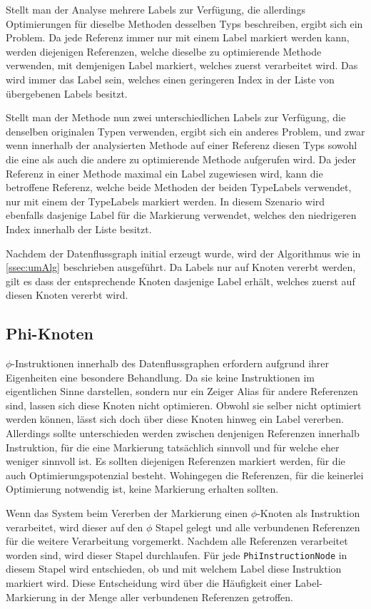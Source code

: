 Stellt man der Analyse mehrere Labels zur Verfügung, die allerdings Optimierungen für 
dieselbe Methoden desselben Typs beschreiben, ergibt sich ein Problem. Da jede 
Referenz immer nur mit einem Label markiert werden kann, werden diejenigen Referenzen, 
welche dieselbe zu optimierende Methode verwenden, mit demjenigen Label markiert, welches 
zuerst verarbeitet wird. Das wird immer das Label sein, welches einen geringeren Index in 
der Liste von übergebenen Labels besitzt. 

Stellt man der Methode nun zwei unterschiedlichen Labels zur Verfügung, die denselben 
originalen Typen verwenden, ergibt sich ein anderes Problem, und zwar wenn 
innerhalb der analysierten Methode auf einer Referenz diesen Typs sowohl die eine 
als auch die andere zu optimierende Methode aufgerufen wird. Da jeder Referenz in 
einer Methode maximal ein Label zugewiesen wird, kann die betroffene Referenz, welche 
beide Methoden der beiden TypeLabels verwendet, nur mit einem der TypeLabels markiert werden. 
In diesem Szenario wird ebenfalls dasjenige Label für die Markierung verwendet, welches den niedrigeren
Index innerhalb der Liste besitzt.

Nachdem der Datenflussgraph initial erzeugt wurde, wird der Algorithmus wie in \ref{ssec:umAlg} 
beschrieben ausgeführt. Da Labels nur auf Knoten vererbt werden, gilt es dass der entsprechende
Knoten dasjenige Label erhält, welches zuerst auf diesen Knoten vererbt wird.  

\subsection{Phi-Knoten}

$\phi$-Instruktionen innerhalb des Datenflussgraphen erfordern aufgrund ihrer Eigenheiten
eine besondere Behandlung. Da sie keine Instruktionen im eigentlichen Sinne darstellen, sondern
nur ein Zeiger Alias für andere Referenzen sind, lassen sich diese Knoten nicht
optimieren. Obwohl sie selber nicht optimiert werden können, lässt sich doch über diese 
Knoten hinweg ein Label vererben. Allerdings sollte unterschieden werden zwischen denjenigen 
Referenzen innerhalb Instruktion, für die eine Markierung tatsächlich sinnvoll und für 
welche eher weniger sinnvoll ist. Es sollten diejenigen Referenzen markiert werden, für die 
auch Optimierungspotenzial besteht. Wohingegen die Referenzen, für die keinerlei 
Optimierung notwendig ist, keine Markierung erhalten sollten. 

Wenn das System beim Vererben der Markierung einen $\phi$-Knoten als Instruktion verarbeitet,
wird dieser auf den $\phi$ Stapel gelegt und alle verbundenen Referenzen für die
weitere Verarbeitung vorgemerkt. Nachdem alle Referenzen verarbeitet worden sind, wird dieser
Stapel durchlaufen. Für jede \texttt{PhiInstructionNode} in diesem Stapel wird entschieden,
ob und mit welchem Label diese Instruktion markiert wird. Diese Entscheidung wird über
die Häufigkeit einer Label-Markierung in der Menge aller verbundenen Referenzen 
getroffen. 

